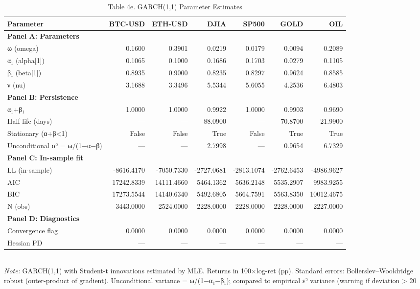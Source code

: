 \begin{table}[ht]
\centering
\caption{Table 4e. GARCH(1,1) Parameter Estimates}
\label{tab:garch_est_4e}
\begin{tabular}{lrrrrrr}
\toprule
Parameter & BTC-USD & ETH-USD & DJIA & SP500 & GOLD & OIL \\
\midrule
\multicolumn{7}{l}{\textbf{Panel A: Parameters}} \\
ω (omega) & 0.1600 & 0.3901 & 0.0219 & 0.0179 & 0.0094 & 0.2089 \\
α₁ (alpha[1]) & 0.1065 & 0.1000 & 0.1686 & 0.1703 & 0.0279 & 0.1105 \\
β₁ (beta[1]) & 0.8935 & 0.9000 & 0.8235 & 0.8297 & 0.9624 & 0.8585 \\
ν (nu) & 3.1688 & 3.3496 & 5.5344 & 5.6055 & 4.2536 & 6.4803 \\
\multicolumn{7}{l}{\textbf{Panel B: Persistence}} \\
α₁+β₁ & 1.0000 & 1.0000 & 0.9922 & 1.0000 & 0.9903 & 0.9690 \\
Half-life (days) & — & — & 88.0900 & — & 70.8700 & 21.9900 \\
Stationary (α+β<1) & False & False & True & False & True & True \\
Unconditional σ² = ω/(1−α−β) & — & — & 2.7998 & — & 0.9654 & 6.7329 \\
\multicolumn{7}{l}{\textbf{Panel C: In-sample fit}} \\
LL (in-sample) & -8616.4170 & -7050.7330 & -2727.0681 & -2813.1074 & -2762.6453 & -4986.9627 \\
AIC & 17242.8339 & 14111.4660 & 5464.1362 & 5636.2148 & 5535.2907 & 9983.9255 \\
BIC & 17273.5544 & 14140.6340 & 5492.6805 & 5664.7591 & 5563.8350 & 10012.4675 \\
N (obs) & 3443.0000 & 2524.0000 & 2228.0000 & 2228.0000 & 2228.0000 & 2227.0000 \\
\multicolumn{7}{l}{\textbf{Panel D: Diagnostics}} \\
Convergence flag & 0.0000 & 0.0000 & 0.0000 & 0.0000 & 0.0000 & 0.0000 \\
Hessian PD & — & — & — & — & — & — \\
\bottomrule
\end{tabular}
\\[3pt]\footnotesize\textit{Note:} GARCH(1,1) with Student-t innovations estimated by MLE. Returns in 100×log-ret (pp). Standard errors: Bollerslev–Wooldridge robust (outer-product of gradient). Unconditional variance = ω/(1−α₁−β₁); compared to empirical ε² variance (warning if deviation > 20%
\end{table}